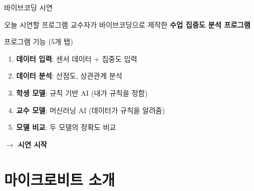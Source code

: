 \documentclass[aspectratio=169, 11pt]{beamer}
\begin{document}
\begin{frame}{바이브코딩 시연}
\begin{alertblock}{오늘 시연할 프로그램}
교수자가 바이브코딩으로 제작한 \textbf{수업 집중도 분석 프로그램}
\end{alertblock}

\vspace{0.5em}

\begin{block}{프로그램 기능 (5개 탭)}
\begin{enumerate}
    \item \textbf{데이터 입력}: 센서 데이터 + 집중도 입력
    \item \textbf{데이터 분석}: 산점도, 상관관계 분석
    \item \textbf{학생 모델}: 규칙 기반 AI (내가 규칙을 정함)
    \item \textbf{교수 모델}: 머신러닝 AI (데이터가 규칙을 알려줌)
    \item \textbf{모델 비교}: 두 모델의 정확도 비교
\end{enumerate}
\end{block}

\vspace{0.5em}

\begin{center}
\Large\bfseries\color{AccentOrange}
$\rightarrow$ 시연 시작
\end{center}
\end{frame}

\section{마이크로비트 소개}
\end{document}
